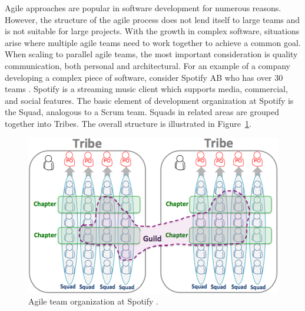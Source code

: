 
Agile approaches are popular in software development for numerous reasons.
However, the structure of the agile process does not lend itself to large teams and is not suitable for large projects.
With the growth in complex software, situations arise where multiple agile teams need to work together to achieve a common goal.
When scaling to parallel agile teams, the most important consideration is quality communication, both personal and architectural.
%
For an example of a company developing a complex piece of software, consider Spotify AB who has over 30 teams \cite{kniberg12}.
Spotify is a streaming music client which supports media, commercial, and social features.
The basic element of development organization at Spotify is the Squad, analogous to a Scrum team.
Squads in related areas are grouped together into Tribes. 
The overall structure is illustrated in Figure~\ref{fig:spotify_structure}.
\begin{figure}[h]
  \includegraphics[width=\linewidth]{images/kniberg12_structure.png}
  \caption{Agile team organization at Spotify \cite{kniberg12}.}
  \label{fig:spotify_structure}
\end{figure}


